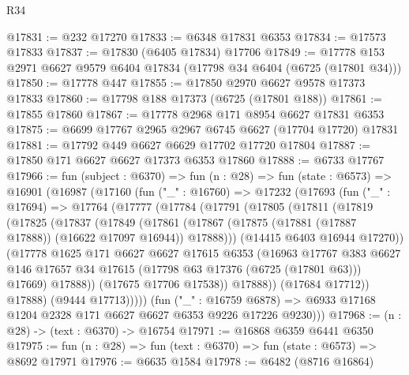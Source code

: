 \begin{lexlean}{R34}
\begin{coremodule}
@17831 := @232 @17270
@17833 := @6348 @17831 @6353
@17834 := @17573 @17833
@17837 := @17830 (@6405 @17834) @17706
@17849 := @17778 @153 @2971 @6627 @9579 @6404 @17834 (@17798 @34 @6404 (@6725 (@17801 @34)))
@17850 := @17778 @447
@17855 := @17850 @2970 @6627 @9578 @17373 @17833
@17860 := @17798 @188 @17373 (@6725 (@17801 @188))
@17861 := @17855 @17860
@17867 := @17778 @2968 @171 @8954 @6627 @17831 @6353
@17875 := @6699 @17767 @2965 @2967 @6745 @6627 (@17704 @17720) @17831
@17881 := @17792 @449 @6627 @6629 @17702 @17720 @17804
@17887 := @17850 @171 @6627 @6627 @17373 @6353 @17860
@17888 := @6733 @17767
@17966 := fun (subject : @6370) =>
  fun (n : @28) =>
  fun (state : @6573) =>
  @16901
    (@16987
      (@17160
        (fun ("_" : @16760) =>
        @17232
          (@17693
            (fun ("_" : @17694) =>
            @17764
              (@17777
                (@17784
                  (@17791
                    (@17805
                      (@17811
                        (@17819
                          (@17825
                            (@17837
                              (@17849
                                (@17861
                                  (@17867
                                    (@17875 (@17881 (@17887 @17888)) (@16622 @17097 @16944))
                                    @17888)))
                              (@14415 @6403 @16944 @17270))
                            (@17778
                              @1625
                              @171
                              @6627
                              @6627
                              @17615
                              @6353
                              (@16963
                                @17767
                                @383
                                @6627
                                @146
                                @17657
                                @34
                                @17615
                                (@17798 @63 @17376 (@6725 (@17801 @63)))
                                @17669)
                              @17888))
                          (@17675 @17706 @17538))
                        @17888))
                    (@17684 @17712))
                  @17888)
                (@9444 @17713)))))
        (fun ("_" : @16759 @6878) =>
        @6933 @17168 @1204 @2328 @171 @6627 @6627 @6353 @9226 @17226 @9230)))
@17968 := (n : @28) -> (text : @6370) -> @16754
@17971 := @16868 @6359 @6441 @6350
@17975 := fun (n : @28) => fun (text : @6370) => fun (state : @6573) => @8692 @17971
@17976 := @6635 @1584
@17978 := @6482 (@8716 @16864)

\end{coremodule}
\end{lexlean}
